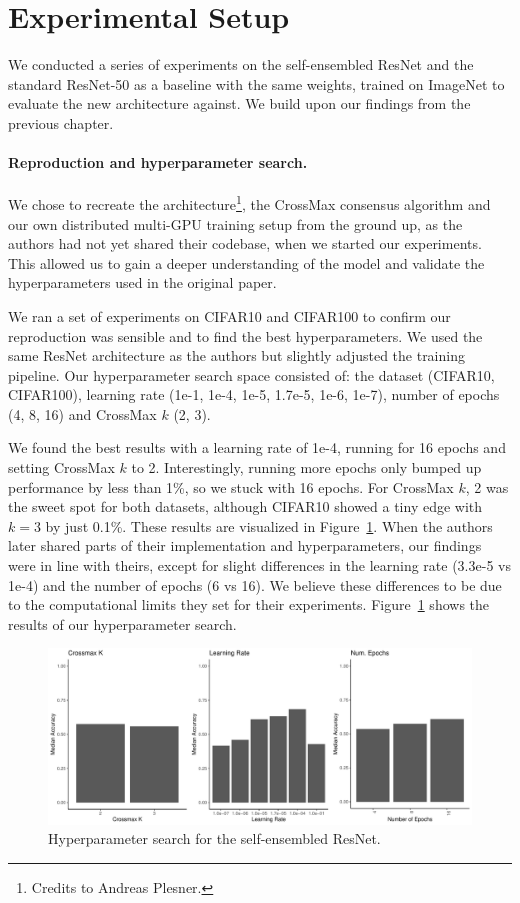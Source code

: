 \documentclass[a4paper, oneside]{discothesis}
\begin{document}
\section{Experimental Setup}

We conducted a series of experiments on the self-ensembled ResNet and the standard ResNet-50 as a baseline with the same weights, trained on ImageNet to evaluate the new architecture against. We build upon our findings from the previous chapter.

\paragraph{Reproduction and hyperparameter search.}

We chose to recreate the architecture\footnote{Credits to Andreas Plesner.}, the CrossMax consensus algorithm and our own distributed multi-GPU training setup from the ground up, as the authors had not yet shared their codebase, when we started our experiments. This allowed us to gain a deeper understanding of the model and validate the hyperparameters used in the original paper.

We ran a set of experiments on CIFAR10 and CIFAR100 to confirm our reproduction was sensible and to find the best hyperparameters. We used the same ResNet architecture as the authors but slightly adjusted the training pipeline. Our hyperparameter search space consisted of: the dataset (CIFAR10, CIFAR100), learning rate (1e-1, 1e-4, 1e-5, 1.7e-5, 1e-6, 1e-7), number of epochs (4, 8, 16) and CrossMax $k$ (2, 3).

We found the best results with a learning rate of 1e-4, running for 16 epochs and setting CrossMax $k$ to 2. Interestingly, running more epochs only bumped up performance by less than 1\%, so we stuck with 16 epochs. For CrossMax $k$, 2 was the sweet spot for both datasets, although CIFAR10 showed a tiny edge with $k=3$ by just 0.1\%. These results are visualized in Figure~\ref{fig:se-hyperparams}. When the authors later shared parts of their implementation and hyperparameters, our findings were in line with theirs, except for slight differences in the learning rate (3.3e-5 vs 1e-4) and the number of epochs (6 vs 16). We believe these differences to be due to the computational limits they set for their experiments. Figure~\ref{fig:se-hyperparams} shows the results of our hyperparameter search.

\begin{figure}
	\centering
	\includegraphics[width=1\columnwidth]{figures/hyperparams.pdf}
	\caption{Hyperparameter search for the self-ensembled ResNet.}
	\label{fig:se-hyperparams}
\end{figure}
\end{document}
